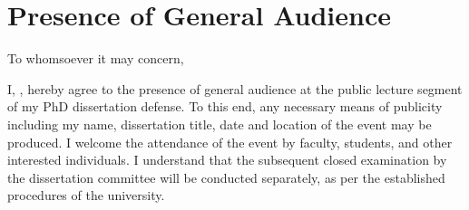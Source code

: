 \documentclass[a4paper,12pt,leqno,openbib]{memoir}
\begin{document}
{}

\chapter*{Presence of General Audience}
\vspace{3cm} 


To whomsoever it may concern,

I, \utsname, hereby agree to the presence of general audience at the public lecture segment of my PhD dissertation defense. To this end, any necessary means of publicity including my name, dissertation title, date and location of the event may be produced. I welcome the attendance of the event by faculty, students, and other interested individuals. 
I understand that the subsequent closed examination by the dissertation committee will be conducted separately, as per the established procedures of the university.


\vspace{3cm}
\noindent
{}
\end{document}
